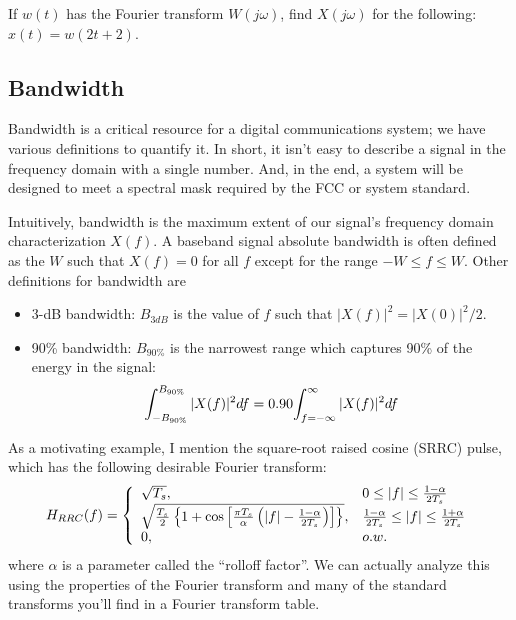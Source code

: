 { If $w(t)$ has the Fourier transform $W(j \omega)$, find $X(j \omega)$ for the following:  $x(t) = w(2t + 2)$.




\subsection{Bandwidth}

Bandwidth is a critical resource for a digital communications system; we have various definitions to quantify it.  In short, it isn't easy to describe a signal in the frequency domain with a single number.  And, in the end, a system will be designed to meet a spectral mask required by the FCC or system standard.

Intuitively, bandwidth is the maximum extent of our signal's frequency domain characterization $X(f)$.  A baseband signal absolute bandwidth is often defined as the $W$ such that $X(f)=0$ for all $f$ except for the range $-W \le f \le W$.  Other definitions for bandwidth are 
\begin{itemize}
 \item 3-dB bandwidth: $B_{3dB}$ is the value of $f$ such that $|X(f)|^2 = |X(0)|^2/2$.
 \item 90\% bandwidth: $B_{90\%}$ is the narrowest range which captures 90\% of the energy in the signal:
\[
  \int_{-B_{90\%}}^{B_{90\%}} |X(f)|^2 df = 0.90 {\int_{f = -\infty}^{\infty} |X(f)|^2 d{f} }
\]
\end{itemize}

As a motivating example, I mention the square-root raised cosine (SRRC) pulse, which has the following desirable Fourier transform:
\begin{equation} \label{E:RRC}
H_{RRC}(f) = { \left\{\begin{array}{ll} {\sqrt{T_{s}}}, & {0 \le |f| \le
\frac{1-\alpha}{2T_{s}}} \\ {\sqrt{\frac{T_{s}}{2}\left\{ 1 + \cos \left[
                      \frac{\pi T_{s}}{\alpha} \left( |f| - \frac{1-\alpha}{2T_{s}}
                       \right)\right]\right\}}}, & { \frac{1-\alpha}{2T_{s}} \le |f| \le
                       \frac{1+\alpha}{2T_{s}}} \\ 0, & o.w. \end{array}\right. }
\end{equation}
where $\alpha$ is a parameter called the ``rolloff factor''.  We can actually analyze this using the properties of the Fourier transform and many of the standard transforms you'll find in a Fourier transform table.

}
